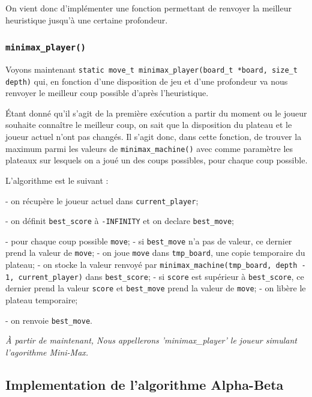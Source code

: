 \documentclass{report}
\begin{document}
On vient donc d'implémenter une fonction permettant de renvoyer la meilleur heuristique jusqu'à une certaine profondeur.

\subsubsection{\texttt{minimax\_player()}}

Voyons maintenant \texttt{static move\_t minimax\_player(board\_t *board, size\_t depth)} qui, en fonction d'une disposition de jeu et d'une profondeur va nous renvoyer le meilleur coup possible d'après l'heuristique.

Étant donné qu'il s'agit de la première exécution a partir du moment ou le joueur souhaite connaître le meilleur coup, on sait que la disposition du plateau et le joueur actuel n'ont pas changés. Il s'agit donc, dans cette fonction, de trouver la maximum parmi les valeurs de \texttt{minimax\_machine()} avec comme paramètre les plateaux sur lesquels on a joué un des coups possibles, pour chaque coup possible.

L'algorithme est le suivant :

- on récupère le joueur actuel dans \texttt{current\_player};

- on définit \texttt{best\_score} à \texttt{-INFINITY} et on declare \texttt{best\_move};

- pour chaque coup possible \texttt{move};
\tabto{1 cm} - si \texttt{best\_move} n'a pas de valeur, ce dernier prend la valeur de \texttt{move};
\tabto{1 cm} - on joue \texttt{move} dans \texttt{tmp\_board}, une copie temporaire du plateau;
\tabto{1 cm} - on stocke la valeur renvoyé par \texttt{minimax\_machine(tmp\_board, depth - 1, current\_player)} dans \texttt{best\_score};
\tabto{1 cm} - si \texttt{score} est supérieur à \texttt{best\_score}, ce dernier prend la valeur \texttt{score} et \texttt{best\_move} prend la valeur de \texttt{move};
\tabto{1 cm} - on libère le plateau temporaire;

- on renvoie \texttt{best\_move}.\newline
\newline



\textit{À partir de maintenant, Nous appellerons 'minimax\_player' le joueur simulant l'agorithme Mini-Max.}

\subsection{Implementation de l'algorithme Alpha-Beta}
\end{document}
